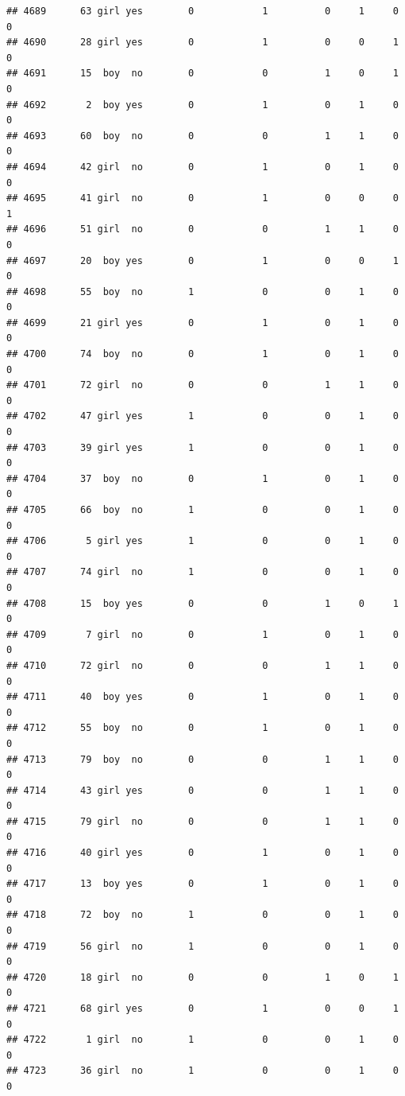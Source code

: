 \documentclass[man]{apa6}
\begin{document}
\begin{verbatim}
## 4689      63 girl yes        0            1          0     1     0     0
## 4690      28 girl yes        0            1          0     0     1     0
## 4691      15  boy  no        0            0          1     0     1     0
## 4692       2  boy yes        0            1          0     1     0     0
## 4693      60  boy  no        0            0          1     1     0     0
## 4694      42 girl  no        0            1          0     1     0     0
## 4695      41 girl  no        0            1          0     0     0     1
## 4696      51 girl  no        0            0          1     1     0     0
## 4697      20  boy yes        0            1          0     0     1     0
## 4698      55  boy  no        1            0          0     1     0     0
## 4699      21 girl yes        0            1          0     1     0     0
## 4700      74  boy  no        0            1          0     1     0     0
## 4701      72 girl  no        0            0          1     1     0     0
## 4702      47 girl yes        1            0          0     1     0     0
## 4703      39 girl yes        1            0          0     1     0     0
## 4704      37  boy  no        0            1          0     1     0     0
## 4705      66  boy  no        1            0          0     1     0     0
## 4706       5 girl yes        1            0          0     1     0     0
## 4707      74 girl  no        1            0          0     1     0     0
## 4708      15  boy yes        0            0          1     0     1     0
## 4709       7 girl  no        0            1          0     1     0     0
## 4710      72 girl  no        0            0          1     1     0     0
## 4711      40  boy yes        0            1          0     1     0     0
## 4712      55  boy  no        0            1          0     1     0     0
## 4713      79  boy  no        0            0          1     1     0     0
## 4714      43 girl yes        0            0          1     1     0     0
## 4715      79 girl  no        0            0          1     1     0     0
## 4716      40 girl yes        0            1          0     1     0     0
## 4717      13  boy yes        0            1          0     1     0     0
## 4718      72  boy  no        1            0          0     1     0     0
## 4719      56 girl  no        1            0          0     1     0     0
## 4720      18 girl  no        0            0          1     0     1     0
## 4721      68 girl yes        0            1          0     0     1     0
## 4722       1 girl  no        1            0          0     1     0     0
## 4723      36 girl  no        1            0          0     1     0     0

\end{verbatim}
\end{document}
